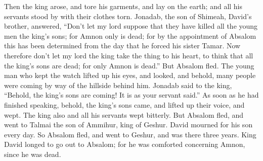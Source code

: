 {\par }{\PP {}Then the king arose, and tore his garments, and lay on the earth; and all his servants stood by with their clothes torn.
Jonadab, the son of Shimeah, David’s brother, answered, “Don’t let my lord suppose that they have killed all the young men the king’s sons; for Amnon only is dead; for by the appointment of Absalom this has been determined from the day that he forced his sister Tamar.
Now therefore don’t let my lord the king take the thing to his heart, to think that all the king’s sons are dead; for only Amnon is dead.”
But Absalom fled. The young man who kept the watch lifted up his eyes, and looked, and behold, many people were coming by way of the hillside behind him.
Jonadab said to the king, “Behold, the king’s sons are coming! It is as your servant said.”
As soon as he had finished speaking, behold, the king’s sons came, and lifted up their voice, and wept. The king also and all his servants wept bitterly.
But Absalom fled, and went to Talmai the son of Ammihur, king of Geshur. David mourned for his son every day.
So Absalom fled, and went to Geshur, and was there three years.
King David longed to go out to Absalom; for he was comforted concerning Amnon, since he was dead.

}
